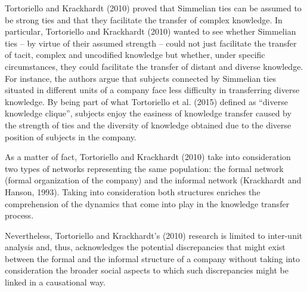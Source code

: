 \documentclass{article}
\begin{document}
Tortoriello and Krackhardt (2010) proved that Simmelian ties can be assumed to be strong ties and that they facilitate the transfer of complex knowledge. In particular, Tortoriello and Krackhardt (2010) wanted to see whether Simmelian ties – by virtue of their assumed strength – could not just facilitate the transfer of tacit, complex and uncodified knowledge but whether, under specific circumstances, they could facilitate the transfer of distant and diverse knowledge. For instance, the authors argue that subjects connected by Simmelian ties situated in different units of a company face less difficulty in transferring diverse knowledge. By being part of what Tortoriello et al. (2015) defined as “diverse knowledge clique”, subjects enjoy the easiness of knowledge transfer caused by the strength of ties and the diversity of knowledge obtained due to the diverse position of subjects in the company.

As a matter of fact, Tortoriello and Krackhardt (2010) take into consideration two types of networks representing the same population: the formal network (formal organization of the company) and the informal network (Krackhardt and Hanson, 1993). Taking into consideration both structures enriches the comprehension of the dynamics that come into play in the knowledge transfer process. 

Nevertheless, Tortoriello and Krackhardt’s (2010) research is limited to inter-unit analysis and, thus, acknowledges the potential discrepancies that might exist between the formal and the informal structure of a company without taking into consideration the broader social aspects to which such discrepancies might be linked in a causational way. 
\end{document}
